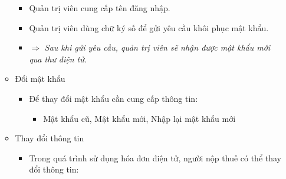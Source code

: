 \begin{itemize}
\begin{itemize}
\begin{itemize}
\item Quản trị viên cung cấp tên đăng nhập.

\item Quản trị viên dùng chữ ký số để gửi yêu cầu khôi phục mật khẩu.

\item $\Rightarrow$ \emph{Sau khi gửi yêu cầu, quản trị viên sẽ nhận được mật khẩu mới qua thư điện tử.}


\end{itemize}

\item Đổi mật khẩu

\begin{itemize}

\item Để thay đổi mật khẩu cần cung cấp thông tin:

\begin{itemize}

\item Mật khẩu cũ, Mật khẩu mới, Nhập lại mật khẩu mới

\end{itemize}








\end{itemize}

\item Thay đổi thông tin

\begin{itemize}

\item Trong quá trình sử dụng hóa đơn điện tử, người nộp thuế có thể thay đổi thông tin:


\end{itemize}
\end{itemize}
\end{itemize}
